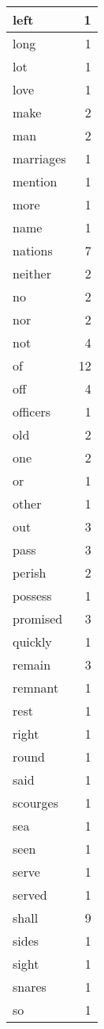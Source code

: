 \begin{center}
\begin{longtable}{l|r}
left & 1\\ \hline 
long & 1\\ \hline 
lot & 1\\ \hline 
love & 1\\ \hline 
make & 2\\ \hline 
man & 2\\ \hline 
marriages & 1\\ \hline 
mention & 1\\ \hline 
more & 1\\ \hline 
name & 1\\ \hline 
nations & 7\\ \hline 
neither & 2\\ \hline 
no & 2\\ \hline 
nor & 2\\ \hline 
not & 4\\ \hline 
of & 12\\ \hline 
off & 4\\ \hline 
officers & 1\\ \hline 
old & 2\\ \hline 
one & 2\\ \hline 
or & 1\\ \hline 
other & 1\\ \hline 
out & 3\\ \hline 
pass & 3\\ \hline 
perish & 2\\ \hline 
possess & 1\\ \hline 
promised & 3\\ \hline 
quickly & 1\\ \hline 
remain & 3\\ \hline 
remnant & 1\\ \hline 
rest & 1\\ \hline 
right & 1\\ \hline 
round & 1\\ \hline 
said & 1\\ \hline 
scourges & 1\\ \hline 
sea & 1\\ \hline 
seen & 1\\ \hline 
serve & 1\\ \hline 
served & 1\\ \hline 
shall & 9\\ \hline 
sides & 1\\ \hline 
sight & 1\\ \hline 
snares & 1\\ \hline 
so & 1\\ \hline 

\end{longtable}
\end{center}
